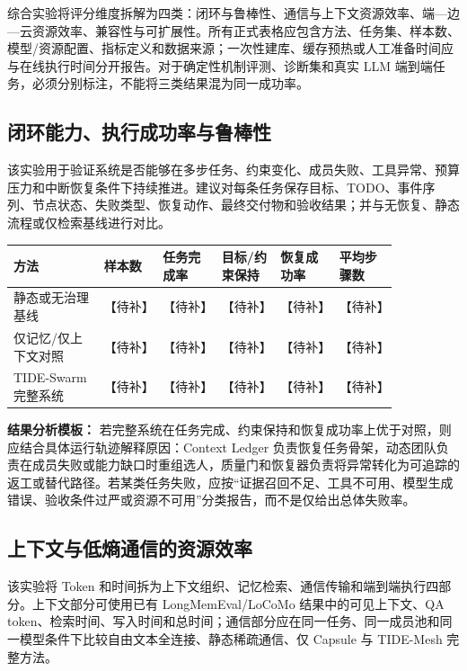 \documentclass[UTF8,a4paper,12pt]{ctexart}
\begin{document}
综合实验将评分维度拆解为四类：闭环与鲁棒性、通信与上下文资源效率、端—边—云资源效率、兼容性与可扩展性。所有正式表格应包含方法、任务集、样本数、模型/资源配置、指标定义和数据来源；一次性建库、缓存预热或人工准备时间应与在线执行时间分开报告。对于确定性机制评测、诊断集和真实 LLM 端到端任务，必须分别标注，不能将三类结果混为同一成功率。

\subsection{闭环能力、执行成功率与鲁棒性}

该实验用于验证系统是否能够在多步任务、约束变化、成员失败、工具异常、预算压力和中断恢复条件下持续推进。建议对每条任务保存目标、TODO、事件序列、节点状态、失败类型、恢复动作、最终交付物和验收结果；并与无恢复、静态流程或仅检索基线进行对比。

\begin{longtable}{p{0.20\linewidth}p{0.13\linewidth}p{0.13\linewidth}p{0.13\linewidth}p{0.13\linewidth}p{0.13\linewidth}}
\toprule
方法 & 样本数 & 任务完成率 & 目标/约束保持 & 恢复成功率 & 平均步骤数 \\
\midrule
静态或无治理基线 & 【待补】 & 【待补】 & 【待补】 & 【待补】 & 【待补】 \\
仅记忆/仅上下文对照 & 【待补】 & 【待补】 & 【待补】 & 【待补】 & 【待补】 \\
TIDE-Swarm 完整系统 & 【待补】 & 【待补】 & 【待补】 & 【待补】 & 【待补】 \\
\bottomrule
\end{longtable}

\textbf{结果分析模板：} 若完整系统在任务完成、约束保持和恢复成功率上优于对照，则应结合具体运行轨迹解释原因：Context Ledger 负责恢复任务骨架，动态团队负责在成员失败或能力缺口时重组选人，质量门和恢复器负责将异常转化为可追踪的返工或替代路径。若某类任务失败，应按“证据召回不足、工具不可用、模型生成错误、验收条件过严或资源不可用”分类报告，而不是仅给出总体失败率。

\subsection{上下文与低熵通信的资源效率}

该实验将 Token 和时间拆为上下文组织、记忆检索、通信传输和端到端执行四部分。上下文部分可使用已有 LongMemEval/LoCoMo 结果中的可见上下文、QA token、检索时间、写入时间和总时间；通信部分应在同一任务、同一成员池和同一模型条件下比较自由文本全连接、静态稀疏通信、仅 Capsule 与 TIDE-Mesh 完整方法。
\end{document}
